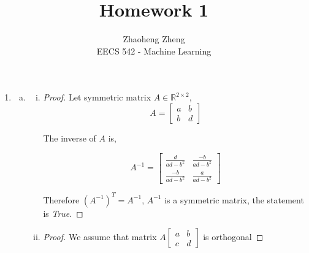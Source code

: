 \documentclass[12pt]{article}
\begin{document}
 
 
 
\title{Homework 1}%
\author{Zhaoheng Zheng\\ %
EECS 542 - Machine Learning} %
 
\maketitle

\begin{enumerate}[1)]
	\item 
   	\begin {enumerate}[(a)]
    	\item
        \begin{enumerate}[(i)]
       	\item
            \begin{proof} 
                Let symmetric matrix $A \in \mathbb{R}^{2 \times 2}$, 
                  $$A = \left[
                      \begin{matrix}
                          a & b \\
                          b & d
                      \end{matrix}
                  \right]$$

              The inverse of $A$ is,

                  $$A^{-1} = \left[
                      \begin{matrix}
                          \frac{d}{ad-b^{2}} & \frac{-b}{ad-b^{2}} \\
                          \frac{-b}{ad-b^{2}} & \frac{a}{ad-b^{2}}
                      \end{matrix}
                  \right]$$

              Therefore $(A^{-1})^{T} = A^{-1}$, $A^{-1}$ is a symmetric matrix, the statement is \emph{True}.  
          \end{proof}
		\item
            \begin{proof}
                We assume that matrix $A \left[
                        \begin{matrix}
                            a & b \\
                            c & d
                        \end{matrix}
                    \right]$ is orthogonal


\end{proof}
\end{enumerate}
\end{enumerate}
\end{enumerate}
\end{document}
